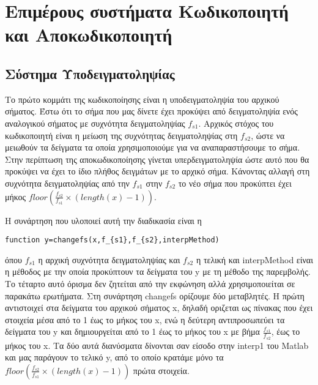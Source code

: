 \chapter{Επιμέρους συστήματα Κωδικοποιητή και Αποκωδικοποιητή}

\section{Σύστημα Υποδειγματοληψίας}

\par Το πρώτο κομμάτι της κωδικοποίησης είναι η υποδειγματοληψία του αρχικού σήματος. 
Έστω ότι το σήμα που μας δίνετε έχει προκύψει από δειγματοληψία ενός αναλογικού 
σήματος με συχνότητα δειγματοληψίας $f_{s1}$. Αρχικός στόχος του κωδικοποιητή 
είναι η μείωση της συχνότητας δειγματοληψίας στη $f_{s2}$, ώστε να μειωθούν τα δείγματα τα 
οποία χρησιμοποιούμε για να αναπαραστήσουμε το σήμα. Στην περίπτωση της αποκωδικοποίησης 
γίνεται υπερδειγματοληψία ώστε αυτό που θα προκύψει να έχει το ίδιο πλήθος δειγμάτων 
με το αρχικό σήμα. Κάνοντας αλλαγή στη συχνότητα δειγματοληψίας από την $f_{s1}$ στην 
$f_{s2}$ το νέο σήμα που προκύπτει έχει μήκος $floor(\frac{f_{s2}}{f_{s1}}\times
(length(x)-1))$.

\par Η συνάρτηση που υλοποιεί αυτή την διαδικασία είναι η 
\begin{lstlisting}[style=MyMatlab]
 function y=changefs(x,f_{s1},f_{s2},interpMethod)
\end{lstlisting}
όπου $f_{s1}$ η αρχική συχνότητα δειγματοληψίας και $f_{s2}$ η τελική και interpMethod είναι η μέθοδος 
με την οποία προκύπτουν τα δείγματα του y με τη μέθοδο της παρεμβολής. Το τέταρτο αυτό 
όρισμα δεν ζητείται από την εκφώνηση αλλά χρησιμοποιείται σε παρακάτω ερωτήματα. 
Στη συνάρτηση changefs ορίζουμε δύο μεταβλητές. Η πρώτη αντιστοιχεί στα δείγματα του αρχικού σήματος 
x, δηλαδή οριζεται ως πίνακας που έχει στοιχεία μέσα από το 1 έως το μήκος του x, 
ενώ η δεύτερη αντιπροσωπεύει τα δείγματα του y και δημιουργείται από το 1 έως το μήκος 
του x με βήμα $\frac{f_{s1}}{f_{s2}}$, έως το μήκος του x. Τα δύο αυτά διανύσματα 
δίνονται σαν είσοδο στην interp1 του Matlab και μας παράγουν το τελικό y, από το οποίο 
κρατάμε μόνο τα $floor(\frac{f_{s2}}{f_{s1}}\times(length(x)-1))$ πρώτα στοιχεία.

